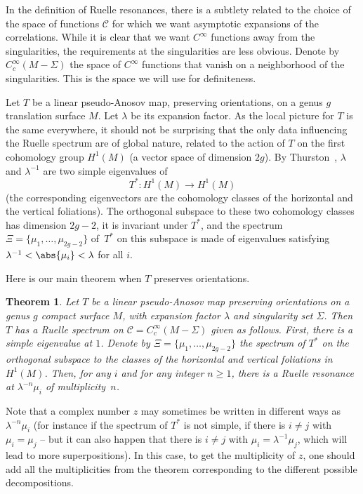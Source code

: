 \documentclass[10pt]{amsart}
\newcommand{\boC}{\mathcal{C}}
\newtheorem{thm}{Theorem}[section]
\theoremstyle{definition}
\numberwithin{equation}{section}
\begin{document}
In the definition of Ruelle resonances, there is a subtlety related to the
choice of the space of functions $\boC$ for which we want asymptotic
expansions of the correlations. While it is clear that we want $C^\infty$
functions away from the singularities, the requirements at the singularities
are less obvious. Denote by $C^\infty_c(M-\Sigma)$ the space of $C^\infty$
functions that vanish on a neighborhood of the singularities. This is the
space we will use for definiteness.

Let $T$ be a linear pseudo-Anosov map, preserving orientations, on a genus
$g$ translation surface $M$. Let $\lambda$ be its expansion factor. As the
local picture for $T$ is the same everywhere, it should not be surprising
that the only data influencing the Ruelle spectrum are of global nature,
related to the action of $T$ on the first cohomology group $H^1(M)$ (a vector
space of dimension $2g$). By Thurston~\cite{thurston_pseudo_anosov},
$\lambda$ and $\lambda^{-1}$ are two simple eigenvalues of
\[
T^* : H^1(M)\to
H^1(M)
\]
(the corresponding eigenvectors are the cohomology classes of the
horizontal and the vertical foliations). The orthogonal subspace to these two
cohomology classes has dimension $2g-2$, it is invariant under $T^*$, and the
spectrum $\Xi = \{\mu_1,\dotsc,\mu_{2g-2}\}$ of~$T^*$ on this subspace is
made of eigenvalues satisfying $\lambda^{-1} < \abs{\mu_i} < \lambda$ for all
$i$.

Here is our main theorem when $T$ preserves orientations.


\begin{thm}
\label{thm:main_preserves_orientations} Let $T$ be a linear pseudo-Anosov map
preserving orientations on a genus $g$ compact surface $M$, with expansion
factor $\lambda$ and singularity set $\Sigma$. Then $T$ has a Ruelle spectrum
on $\boC = C^\infty_c(M-\Sigma)$ given as follows. First, there is a simple
eigenvalue at $1$. Denote by $\Xi = \{\mu_1,\dotsc, \mu_{2g-2}\}$ the
spectrum of $T^*$ on the orthogonal subspace to the classes of the horizontal
and vertical foliations in $H^1(M)$. Then, for any $i$ and for any integer
$n\geq 1$, there is a Ruelle resonance at $\lambda^{-n} \mu_i$ of
multiplicity~$n$.
\end{thm}

Note that a complex number $z$ may sometimes be written in different ways as
$\lambda^{-n}\mu_i$ (for instance if the spectrum of $T^*$ is not simple,
\ie if there is $i\neq j$ with $\mu_i = \mu_j$ -- but it can also happen
that there is $i\neq j$ with $\mu_i = \lambda^{-1}\mu_j$, which will lead to
more superpositions). In this case, to get the multiplicity of $z$, one
should add all the multiplicities from the theorem corresponding to the
different possible decompositions.
\end{document}

